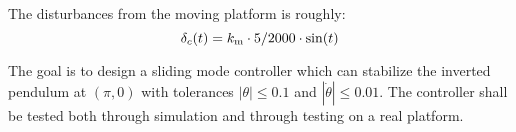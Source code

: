 The disturbances from the moving platform is roughly:
\begin{equation}
        \delta_c(t) = k_{\mathrm{m}} \cdot 5/2000 \cdot \sin(t)
\end{equation}

The goal is to design a sliding mode controller which can stabilize the inverted pendulum at $(\pi,0)$ with tolerances $|\theta| \leq 0.1$ and $|\dot{\theta}| \leq 0.01$. The controller shall be tested both through simulation and through testing on a real platform.
